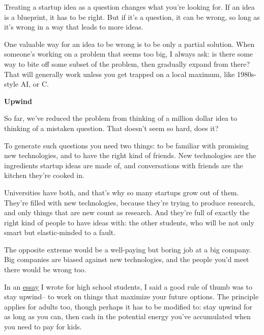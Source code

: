 Treating
                    a startup idea as a question changes what you're looking
                    for. If an idea is a blueprint, it has to be right. But if
                    it's a question, it can be wrong, so long as it's wrong in a
                    way that leads to more ideas.

One valuable way
                    for an idea to be wrong is to be only a partial solution.
                    When someone's working on a problem that seems too big, I
                    always ask: is there some way to bite off some subset of the
                    problem, then gradually expand from there? That will
                    generally work unless you get trapped on a local maximum,
                    like 1980s-style AI, or C.

\textbf{Upwind}

So far, we've reduced the problem from thinking
                    of a million dollar idea to thinking of a mistaken question.
                    That doesn't seem so hard, does it?

To generate
                    such questions you need two things: to be familiar with
                    promising new technologies, and to have the right kind of
                    friends. New technologies are the ingredients startup ideas
                    are made of, and conversations with friends are the kitchen
                    they're cooked in.

Universities have both, and
                    that's why so many startups grow out of them. They're filled
                    with new technologies, because they're trying to produce
                    research, and only things that are new count as research.
                    And they're full of exactly the right kind of people to have
                    ideas with: the other students, who will be not only smart
                    but elastic-minded to a fault.

The opposite
                    extreme would be a well-paying but boring job at a big
                    company. Big companies are biased against new technologies,
                    and the people you'd meet there would be wrong too.

In
                    an \href{http://www.paulgraham.com/hs.html}{essay} I wrote for high school
                    students, I said a good rule of thumb was to stay upwind--
                    to work on things that maximize your future options. The
                    principle applies for adults too, though perhaps it has to
                    be modified to: stay upwind for as long as you can, then
                    cash in the potential energy you've accumulated when you
                    need to pay for kids.

